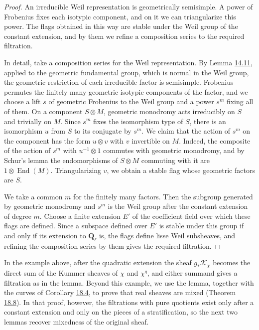 \documentclass[11pt]{article}
\begin{document}
\begin{proof}[{Proof}]\label{bp289}%
An irreducible Weil representation is geometrically semisimple. A power of Frobenius fixes each isotypic component, and on it we can triangularize this power. The flags obtained in this way are stable under the Weil group of the constant extension, and by them we refine a composition series to the required filtration.

In detail, take a composition series for the Weil representation. By Lemma \hyperref[bp75]{14.11}, applied to the geometric fundamental group, which is normal in the Weil group, the geometric restriction of each irreducible factor is semisimple. Frobenius permutes the finitely many geometric isotypic components of the factor, and we choose a lift \(s\) of geometric Frobenius to the Weil group and a power \(s^m\) fixing all of them. On a component \(S\otimes M\), geometric monodromy acts irreducibly on \(S\) and trivially on \(M\). Since \(s^m\) fixes the isomorphism type of \(S\), there is an isomorphism \(u\) from \(S\) to its conjugate by \(s^m\). We claim that the action of \(s^m\) on the component has the form \(u\otimes v\) with \(v\) invertible on \(M\). Indeed, the composite of the action of \(s^m\) with \(u^{-1}\otimes1\) commutes with geometric monodromy, and by Schur's lemma the endomorphisms of \(S\otimes M\) commuting with it are \(1\otimes\operatorname{End}(M)\). Triangularizing \(v\), we obtain a stable flag whose geometric factors are \(S\).

We take a common \(m\) for the finitely many factors. Then the subgroup generated by geometric monodromy and \(s^m\) is the Weil group after the constant extension of degree \(m\). Choose a finite extension \(E'\) of the coefficient field over which these flags are defined. Since a subspace defined over \(E'\) is stable under this group if and only if its extension to \(\overline{\mathbf Q}_\ell\) is, the flags define lisse Weil subsheaves, and refining the composition series by them gives the required filtration.
\end{proof}

\label{bp290}%
In the example above, after the quadratic extension the sheaf \(g_*\mathcal K_\chi\) becomes the direct sum of the Kummer sheaves of \(\chi\) and \(\chi^q\), and either summand gives a filtration as in the lemma. Beyond this example, we use the lemma, together with the curves of Corollary \hyperref[bp284]{18.4}, to prove that real sheaves are mixed (Theorem \hyperref[bp295]{18.8}). In that proof, however, the filtrations with pure quotients exist only after a constant extension and only on the pieces of a stratification, so the next two lemmas recover mixedness of the original sheaf.
\end{document}
